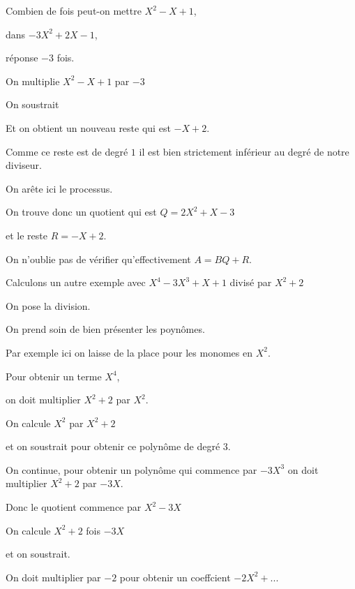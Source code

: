 \change

Combien de fois peut-on mettre  $X^2-X+1$,

dans $-3X^2 +2X - 1$,

réponse $-3$ fois.

\change

On multiplie  $X^2-X+1$ par $-3$

\change

On soustrait

\change


Et on obtient un nouveau reste qui est $-X+2$.

Comme ce reste est de degré $1$ il est bien strictement inférieur au degré de notre diviseur.

On arête ici le processus.

On trouve donc un quotient qui est $Q = 2X^2+X-3$

et le reste $R=-X+2$.


On n'oublie pas de vérifier qu'effectivement $A=BQ+R$.

\diapo

Calculons un autre exemple avec
$X^4-3X^3+X+1$ divisé par $X^2+2$ 


\change

\change

On pose la division.

On prend soin de bien présenter les poynômes.

Par exemple ici on laisse de la place pour les monomes en $X^2$.

\change

Pour obtenir un terme $X^4$,

on doit multiplier $X^2+2$ par $X^2$.

\change

On calcule $X^2$ par $X^2+2$

et on soustrait pour obtenir ce polynôme de degré $3$.


On continue, pour obtenir un polynôme qui commence par $-3X^3$ on doit
multiplier $X^2+2$ par $-3X$.

\change 

Donc le quotient commence par $X^2-3X$

\change

On calcule $X^2+2$ fois $-3X$

et on soustrait.

\change

On doit multiplier par $-2$ pour obtenir un coeffcient $-2X^2+...$


